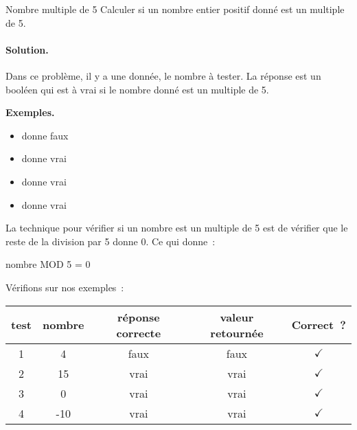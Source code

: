 			\begin{Exercice}{Nombre multiple de 5}
				\label{algo:mult5}
				Calculer si un nombre entier positif donné est un multiple de 5.
				\paragraph{Solution.}
				Dans ce problème,
				il y a une donnée, le nombre à tester.
				La réponse est un booléen
				qui est à vrai si le nombre donné est un multiple de 5.
				\begin{center}
				\end{center}
				\textbf{Exemples.}
				\begin{multicols}{4}
					\begin{itemize}
					\item {} donne faux
					\item {} donne vrai
					\item {} donne vrai
					\item {} donne vrai
					\end{itemize}
				\end{multicols}
				La technique pour vérifier si un nombre est
				un multiple de 5 est de vérifier que le reste
				de la division par 5 donne 0.
				Ce qui donne~:
				\begin{LDA}[1]
						\Return nombre MOD 5 = 0
					\EndAlgo
				\end{LDA}
				Vérifions sur nos exemples~:
				\begin{center}
				\begin{tabular}{|c|c|c|c|c|}
				\hline
				test \no & nombre & réponse correcte & valeur retournée & Correct~? \\\hline
				\hline 
				1 & 4   & faux & faux & {\color{ForestGreen}$\checkmark$} \\\hline
				2 & 15  & vrai & vrai & {\color{ForestGreen}$\checkmark$} \\\hline
				3 & 0   & vrai & vrai & {\color{ForestGreen}$\checkmark$} \\\hline
				4 & -10 & vrai & vrai & {\color{ForestGreen}$\checkmark$} \\\hline
				\end{tabular}
				\end{center}
			\end{Exercice}

